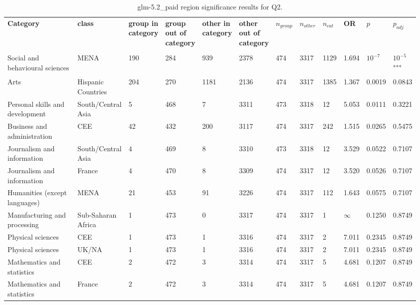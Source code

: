 \clearpage
\begin{landscape}
\begin{table}[p]
\centering
\caption{glm-5.2_paid region significance results for Q2.}
\label{tab:appendix-q2-glm-5.2_paid-region}
\scriptsize
\renewcommand{\arraystretch}{0.92}
\setlength{\tabcolsep}{2pt}
\begin{tabular}{p{0.35\linewidth}p{0.1\linewidth}p{0.05\linewidth}p{0.05\linewidth}p{0.05\linewidth}p{0.05\linewidth}p{0.05\linewidth}p{0.05\linewidth}p{0.05\linewidth}p{0.05\linewidth}p{0.05\linewidth}p{0.06\linewidth}}
\toprule
\textbf{Category} & \textbf{class} & \textbf{group in category} & \textbf{group out of category} & \textbf{other in category} & \textbf{other out of category} & \textbf{$n_{group}$} & \textbf{$n_{other}$} & \textbf{$n_{cat}$} & \textbf{OR} & \textbf{$p$} & \textbf{$p_{adj}$} \\\\
\midrule
Social and behavioural sciences & MENA & 190 & 284 & 939 & 2378 & 474 & 3317 & 1129 & 1.694 & $10^{-7}$ & $10^{-5}$\textsuperscript{***} \\
Arts & Hispanic Countries & 204 & 270 & 1181 & 2136 & 474 & 3317 & 1385 & 1.367 & 0.0019 & 0.0843 \\
Personal skills and development & South/Central Asia & 5 & 468 & 7 & 3311 & 473 & 3318 & 12 & 5.053 & 0.0111 & 0.3221 \\
Business and administration & CEE & 42 & 432 & 200 & 3117 & 474 & 3317 & 242 & 1.515 & 0.0265 & 0.5475 \\
Journalism and information & South/Central Asia & 4 & 469 & 8 & 3310 & 473 & 3318 & 12 & 3.529 & 0.0522 & 0.7107 \\
Journalism and information & France & 4 & 470 & 8 & 3309 & 474 & 3317 & 12 & 3.520 & 0.0526 & 0.7107 \\
Humanities (except languages) & MENA & 21 & 453 & 91 & 3226 & 474 & 3317 & 112 & 1.643 & 0.0575 & 0.7107 \\
Manufacturing and processing & Sub-Saharan Africa & 1 & 473 & 0 & 3317 & 474 & 3317 & 1 & $\infty$ & 0.1250 & 0.8749 \\
Physical sciences & CEE & 1 & 473 & 1 & 3316 & 474 & 3317 & 2 & 7.011 & 0.2345 & 0.8749 \\
Physical sciences & UK/NA & 1 & 473 & 1 & 3316 & 474 & 3317 & 2 & 7.011 & 0.2345 & 0.8749 \\
Mathematics and statistics & CEE & 2 & 472 & 3 & 3314 & 474 & 3317 & 5 & 4.681 & 0.1207 & 0.8749 \\
Mathematics and statistics & France & 2 & 472 & 3 & 3314 & 474 & 3317 & 5 & 4.681 & 0.1207 & 0.8749 \\

\end{tabular}
\end{table}
\end{landscape}
